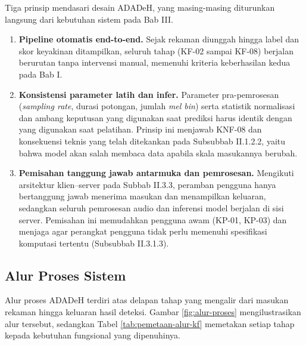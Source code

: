 Tiga prinsip mendasari desain ADADeH, yang masing-masing diturunkan langsung dari
kebutuhan sistem pada Bab III.

\begin{enumerate}
  \item \textbf{Pipeline otomatis end-to-end.} Sejak rekaman diunggah hingga label
  dan skor keyakinan ditampilkan, seluruh tahap (KF-02 sampai KF-08) berjalan
  berurutan tanpa intervensi manual, memenuhi kriteria keberhasilan kedua pada
  Bab I.
  \item \textbf{Konsistensi parameter latih dan infer.} Parameter pra-pemrosesan
  (\textit{sampling rate}, durasi potongan, jumlah \textit{mel bin}) serta statistik
  normalisasi dan ambang keputusan yang digunakan saat prediksi harus identik
  dengan yang digunakan saat pelatihan. Prinsip ini menjawab KNF-08 dan konsekuensi
  teknis yang telah ditekankan pada Subsubbab II.1.2.2, yaitu bahwa model akan salah
  membaca data apabila skala masukannya berubah.
  \item \textbf{Pemisahan tanggung jawab antarmuka dan pemrosesan.} Mengikuti
  arsitektur klien--server pada Subbab II.3.3, peramban pengguna hanya bertanggung
  jawab menerima masukan dan menampilkan keluaran, sedangkan seluruh pemrosesan
  audio dan inferensi model berjalan di sisi server. Pemisahan ini memudahkan
  pengguna awam (KP-01, KP-03) dan menjaga agar perangkat pengguna tidak perlu
  memenuhi spesifikasi komputasi tertentu (Subsubbab II.3.1.3).
\end{enumerate}

\subsection{Alur Proses Sistem}
\label{subsec:alur-proses-sistem}

Alur proses ADADeH terdiri atas delapan tahap yang mengalir dari masukan rekaman
hingga keluaran hasil deteksi. Gambar \ref{fig:alur-proses} mengilustrasikan alur
tersebut, sedangkan Tabel \ref{tab:pemetaan-alur-kf} memetakan setiap tahap kepada
kebutuhan fungsional yang dipenuhinya.

